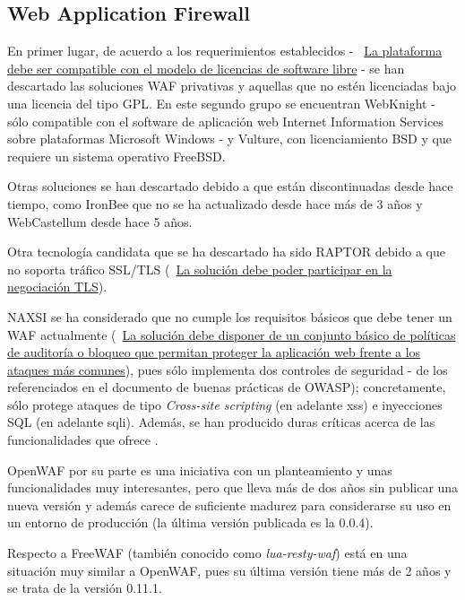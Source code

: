 \subsection{Web Application Firewall}
\par En primer lugar, de acuerdo a los requerimientos establecidos - {~\hyperref[req:softwarelibre]{La plataforma debe ser compatible con el modelo de
licencias de software libre}} - se han descartado las soluciones WAF privativas y aquellas que no estén licenciadas bajo una licencia del tipo GPL.  En
este segundo grupo se encuentran WebKnight - sólo compatible con el software de aplicación web Internet Information Services\cite{iis} sobre plataformas
Microsoft Windows - y Vulture, con licenciamiento BSD y que requiere un sistema operativo FreeBSD.

\par Otras soluciones se han descartado debido a que están discontinuadas desde hace tiempo, como IronBee que no se ha actualizado desde hace más de 3 años
y WebCastellum desde hace 5 años.

\par Otra tecnología candidata que se ha descartado ha sido RAPTOR debido a que no soporta tráfico SSL/TLS ({~\hyperref[req:tls]{La solución debe poder
participar en la negociación TLS}}).

\par NAXSI se ha considerado que no cumple los requisitos básicos que debe tener un WAF actualmente ({~\hyperref[req:commonattacks]{La solución debe
disponer de un conjunto básico de políticas de auditoría o bloqueo que permitan proteger la aplicación web frente a los ataques más comunes}}), pues
sólo implementa dos controles de seguridad - de los referenciados en el documento de buenas prácticas de OWASP\cite[apartado A3.2]{owaspbestpractices});
concretamente, sólo protege ataques de tipo {\em Cross-site scripting} (en adelante \acrshort{xss}\cite{owaspxss}) e inyecciones SQL (en adelante
\acrshort{sqli}\cite{owaspsqli}). Además, se han producido duras críticas acerca de las funcionalidades que ofrece \cite{naxsianalisis}.

\par OpenWAF por su parte es una iniciativa con un planteamiento y unas funcionalidades muy interesantes, pero que lleva más de dos años sin
publicar una nueva versión y además carece de suficiente madurez para considerarse su uso en un entorno de producción (la última versión
publicada es la 0.0.4).

\par Respecto a FreeWAF (también conocido como {\em lua-resty-waf}) está en una situación muy similar a OpenWAF, pues su última versión tiene más de 2
años y se trata de la versión 0.11.1\cite{freewafchangelog}.

